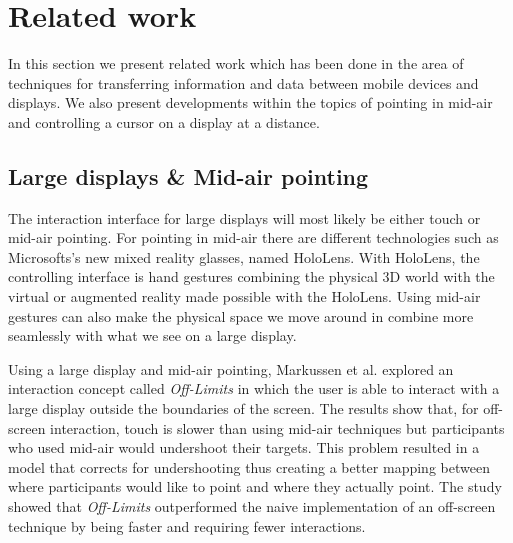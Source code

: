 \section{Related work} \label{sec:relatedwork}
In this section we present related work which has been done in the area of techniques for transferring information and data between mobile devices and displays.
We also present developments within the topics of pointing in mid-air and controlling a cursor on a display at a distance.

\subsection{Large displays \& Mid-air pointing} \label{sec:largeDisplayAirPointing}
The interaction interface for large displays will most likely be either touch or mid-air pointing.
For pointing in mid-air there are different technologies such as Microsofts's new mixed reality glasses, named HoloLens. 
With HoloLens, the controlling interface is hand gestures combining the physical 3D world with the virtual or augmented reality made possible with the HoloLens. 
Using mid-air gestures can also make the physical space we move around in combine more seamlessly with what we see on a large display.

Using a large display and mid-air pointing, Markussen et al. \cite{Markussen:2016} explored an interaction concept called \emph{Off-Limits} in which the user is able to interact with a large display outside the boundaries of the screen.
The results show that, for off-screen interaction, touch is slower than using mid-air techniques but participants who used mid-air would undershoot their targets.
This problem resulted in a model that corrects for undershooting thus creating a better mapping between where participants would like to point and where they actually point.
The study showed that \emph{Off-Limits} outperformed the naive implementation of an off-screen technique by being faster and requiring fewer interactions.

